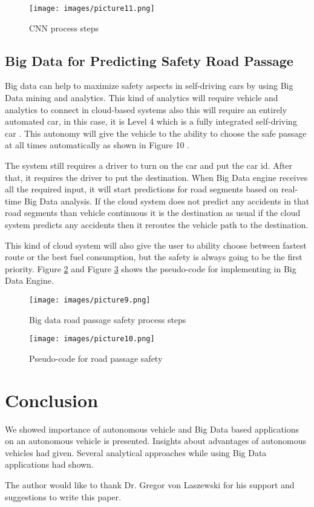 \documentclass[sigconf]{acmart}
\begin{document}
\begin{figure}[!ht]
  \centering
      \texttt{[image: images/picture11.png]}
  \caption{CNN process steps}\label{fig:nvidiaCNNmodel}
\end{figure}

\subsection{Big Data for Predicting Safety Road Passage}
Big data can help to maximize safety aspects in self-driving cars by using Big Data mining and analytics. This kind of analytics will require vehicle and analytics to connect in cloud-based systems also this will require an entirely automated car, in this case, it is Level 4 which is a fully integrated self-driving car \cite{hamzah}. This autonomy will give the vehicle to the ability to choose the safe passage at all times automatically as shown in Figure 10 \cite{hamzah}.
\par The system still requires a driver to turn on the car and put the car id. After that, it requires the driver to put the destination. When Big Data engine receives all the required input, it will start predictions for road segments based on real-time Big Data analysis. If the cloud system does not predict any accidents in that road segments than vehicle continuous it is the destination as usual if the cloud system predicts any accidents then it reroutes the vehicle path to the destination\cite{hamzah}.
\par This kind of cloud system will also give the user to ability choose between fastest route or the best fuel consumption, but the safety is always going to be the first priority. Figure \ref{fig:architecture} and Figure \ref{fig:pseudo-code} shows the pseudo-code for implementing in Big Data Engine\cite{hamzah}.
\begin{figure}[!ht]
  \centering
      \texttt{[image: images/picture9.png]}
  \caption{Big data road passage safety process steps}\label{fig:architecture}
\end{figure}

\begin{figure}[!ht]
  \centering
      \texttt{[image: images/picture10.png]}
  \caption{Pseudo-code for road passage safety}\label{fig:pseudo-code}
\end{figure}

\section{Conclusion}
    We showed importance of autonomous vehicle and Big Data based applications on an autonomous vehicle is presented. Insights about advantages of autonomous vehicles had given. Several analytical approaches while using Big Data applications had shown.

\begin{acks}

The author would like to thank Dr. Gregor von Laszewski for his support and suggestions to write this paper.

\end{acks}


 
\end{document}
